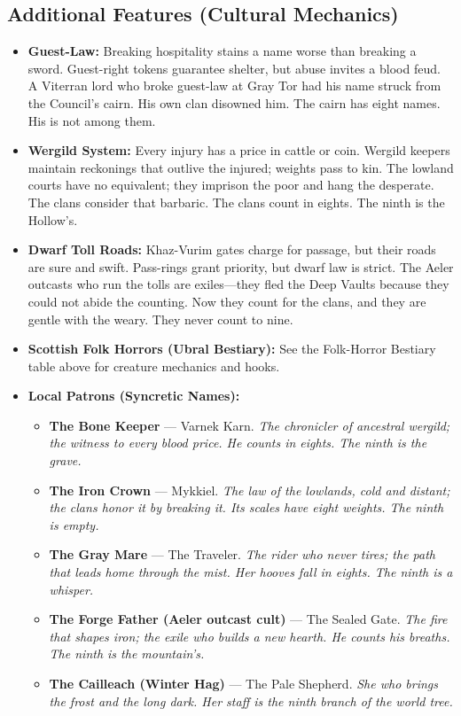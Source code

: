 \subsection*{Additional Features (Cultural Mechanics)}
\label{sec:ubral-mechanics}
\begin{itemize}
\item \textbf{Guest-Law:} Breaking hospitality stains a name worse than breaking a sword. Guest-right tokens guarantee shelter, but abuse invites a blood feud. A Viterran lord who broke guest-law at Gray Tor had his name struck from the Council's cairn. His own clan disowned him. The cairn has eight names. His is not among them.
\item \textbf{Wergild System:} Every injury has a price in cattle or coin. Wergild keepers maintain reckonings that outlive the injured; weights pass to kin. The lowland courts have no equivalent; they imprison the poor and hang the desperate. The clans consider that barbaric. The clans count in eights. The ninth is the Hollow's.
\item \textbf{Dwarf Toll Roads:} Khaz-Vurim gates charge for passage, but their roads are sure and swift. Pass-rings grant priority, but dwarf law is strict. The Aeler outcasts who run the tolls are exiles---they fled the Deep Vaults because they could not abide the counting. Now they count for the clans, and they are gentle with the weary. They never count to nine.
\item \textbf{Scottish Folk Horrors (Ubral Bestiary):} See the Folk-Horror Bestiary table above for creature mechanics and hooks.
\item \textbf{Local Patrons (Syncretic Names):}
  \begin{itemize}
    \item \textbf{The Bone Keeper} --- Varnek Karn. \textit{The chronicler of ancestral wergild; the witness to every blood price. He counts in eights. The ninth is the grave.}
    \item \textbf{The Iron Crown} --- Mykkiel. \textit{The law of the lowlands, cold and distant; the clans honor it by breaking it. Its scales have eight weights. The ninth is empty.}
    \item \textbf{The Gray Mare} --- The Traveler. \textit{The rider who never tires; the path that leads home through the mist. Her hooves fall in eights. The ninth is a whisper.}
    \item \textbf{The Forge Father (Aeler outcast cult)} --- The Sealed Gate. \textit{The fire that shapes iron; the exile who builds a new hearth. He counts his breaths. The ninth is the mountain's.}
    \item \textbf{The Cailleach (Winter Hag)} --- The Pale Shepherd. \textit{She who brings the frost and the long dark. Her staff is the ninth branch of the world tree.}
  \end{itemize}
\end{itemize}

